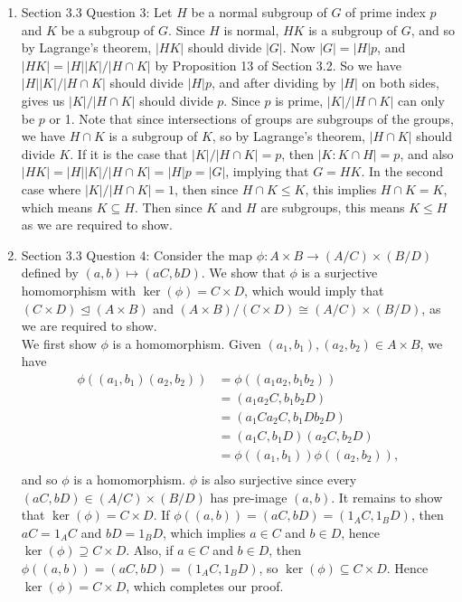 \documentclass{article}
\begin{document}
\begin{enumerate}
  \item Section 3.3 Question 3: Let $H$ be a normal subgroup of $G$ of
    prime index $p$ and $K$ be a subgroup of $G$. Since $H$ is normal, $HK$
    is a subgroup of $G$, and so by Lagrange's theorem, $|HK|$ should
    divide $|G|$. Now $|G|=|H|p$, and
    $|HK|=|H||K|/|H\cap K|$ by Proposition 13 of Section 3.2. So we have
    $|H||K|/|H\cap K|$ should divide $|H|p$, and after dividing by $|H|$ on
    both sides, gives us $|K|/|H\cap K|$ should divide $p$. Since $p$ is
    prime, $|K|/|H\cap K|$ can only be $p$ or 1. Note that since
    intersections of groups are subgroups of the groups, we have $H\cap K$
    is a subgroup of $K$, so by Lagrange's theorem, $|H\cap K|$ should
    divide $K$. If it is the case that $|K|/|H\cap K|=p$, then $|K:K\cap
    H|=p$, and also $|HK|=|H||K|/|H\cap K|=|H|p=|G|$, implying that $G=HK$.
    In the second case where $|K|/|H\cap K|=1$, then since $H\cap K\leq K$,
    this implies $H\cap K=K$, which means $K\subseteq H$. Then since $K$
    and $H$ are subgroups, this means $K\leq H$ as we are required to show.

  \item Section 3.3 Question 4: Consider the map $\phi:A\times
    B\rightarrow(A/C)\times(B/D)$ defined by $(a,b)\mapsto(aC,bD)$. We show
    that $\phi$ is a surjective homomorphism with $\ker(\phi)=C\times D$,
    which would imply that $(C\times D)\trianglelefteq(A\times B)$ and
    $(A\times B)/(C\times D)\cong(A/C)\times(B/D)$, as we are required to
    show. \\

    We first show $\phi$ is a homomorphism. Given $(a_1,b_1),(a_2,b_2)\in
    A\times B$, we have
    \begin{align*}
      \phi((a_1,b_1)(a_2,b_2))  &= \phi((a_1a_2,b_1b_2))  \\
                                &= (a_1a_2C,b_1b_2D)      \\
                                &= (a_1Ca_2C,b_1Db_2D)    \\
                                &= (a_1C,b_1D)(a_2C,b_2D) \\
                                &= \phi((a_1,b_1))\phi((a_2,b_2)),  \\
    \end{align*}
    and so $\phi$ is a homomorphism. $\phi$ is also surjective since every
    $(aC,bD)\in(A/C)\times(B/D)$ has pre-image $(a,b)$. It remains to show
    that $\ker(\phi)=C\times D$. If $\phi((a,b))=(aC,bD)=(1_AC,1_BD)$, then
    $aC=1_AC$ and $bD=1_BD$, which implies $a\in C$ and $b\in D$, hence
    $\ker(\phi)\supseteq C\times D$. Also, if $a\in C$ and $b\in D$, then
    $\phi((a,b))=(aC,bD)=(1_AC,1_BD)$, so $\ker(\phi)\subseteq C\times D$.
    Hence $\ker(\phi)=C\times D$, which completes our proof.


\end{enumerate}
\end{document}

